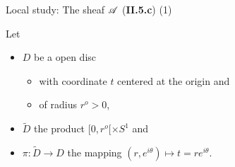 \begin{frame}[t]{Local study: The sheaf $\mathscr{A}$ (\textbf{II.5.c}) (1)}
  \def\myincl{\textcolor{green!40!black}{i}}
  \def\mymnf{\textcolor{blue!40!black}{]-\epsilon,r^o[\times S^1\times X}}
  \def\mysheaf{\textcolor{yellow!60!black}{\sC_{\mymnf}^\infty}}
  \def\mypbsheaf{\myincl^{-1}\mysheaf}

  Let
  \begin{itemize}
    \item $D$ be a open disc
      \begin{itemize}
        \item with coordinate $t$ centered at the origin and
        \item of radius $r^o>0$,
      \end{itemize}
    \item $\tilde D$ the product $[0,r^o[\times S^1$ and
    \item $\pi: \tilde D\to D$ the mapping
      $(r,e^{i\theta})\mapsto t=re^{i\theta}$.
  \end{itemize}


\end{frame}
